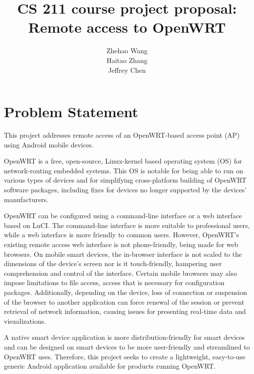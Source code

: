 \documentclass{sig-alternate-05-2015}
\begin{document}
	
	\title{CS 211 course project proposal: \\Remote access to OpenWRT}
	
	
	\author{
		\alignauthor
		Zhehao Wang \\
		\alignauthor
		Haitao Zhang \\
		\alignauthor 
		Jeffrey Chen
	}
	
	\maketitle
	
	\section{Problem Statement}
	
	This project addresses remote access of an OpenWRT-based access point (AP) using Android mobile devices.
	
	OpenWRT is a free, open-source, Linux-kernel based operating system (OS) for network-routing embedded systems. This OS is notable for being able to run on various types of devices and for simplifying cross-platform building of OpenWRT software packages, including fixes for devices no longer supported by the devices' manufacturers.
	
	OpenWRT can be configured using a command-line interface or a web interface based on LuCI. The command-line interface is more suitable to professional users, while a web interface is more friendly to common users. However, OpenWRT's existing remote access web interface is not phone-friendly, being made for web browsers. On mobile smart devices, the in-browser interface is not scaled to the dimensions of the device's screen nor is it touch-friendly, hampering user comprehension and control of the interface. Certain mobile browsers may also impose limitations to file access, access that is necessary for configuration packages. Additionally, depending on the device, loss of connection or suspension of the browser to another application can force renewal of the session or prevent retrieval of network information, causing issues for presenting real-time data and visualizations.
	
	A native smart device application is more distribution-friendly for smart devices and can be designed on smart devices to be more user-friendly and streamlined to OpenWRT uses. Therefore, this project seeks to create a lightweight, easy-to-use generic Android application available for products running OpenWRT.
	
\end{document}
